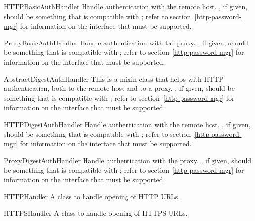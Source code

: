 \begin{classdesc}{HTTPBasicAuthHandler}{}
Handle authentication with the remote host.
, if given, should be something that is compatible
with ; refer to section~\ref{http-password-mgr}
for information on the interface that must be supported.
\end{classdesc}

\begin{classdesc}{ProxyBasicAuthHandler}{}
Handle authentication with the proxy.
, if given, should be something that is compatible
with ; refer to section~\ref{http-password-mgr}
for information on the interface that must be supported.
\end{classdesc}

\begin{classdesc}{AbstractDigestAuthHandler}{}
This is a mixin class that helps with HTTP authentication, both
to the remote host and to a proxy.
, if given, should be something that is compatible
with ; refer to section~\ref{http-password-mgr}
for information on the interface that must be supported.
\end{classdesc}

\begin{classdesc}{HTTPDigestAuthHandler}{}
Handle authentication with the remote host.
, if given, should be something that is compatible
with ; refer to section~\ref{http-password-mgr}
for information on the interface that must be supported.
\end{classdesc}

\begin{classdesc}{ProxyDigestAuthHandler}{}
Handle authentication with the proxy.
, if given, should be something that is compatible
with ; refer to section~\ref{http-password-mgr}
for information on the interface that must be supported.
\end{classdesc}

\begin{classdesc}{HTTPHandler}{}
A class to handle opening of HTTP URLs.
\end{classdesc}

\begin{classdesc}{HTTPSHandler}{}
A class to handle opening of HTTPS URLs.
\end{classdesc}

